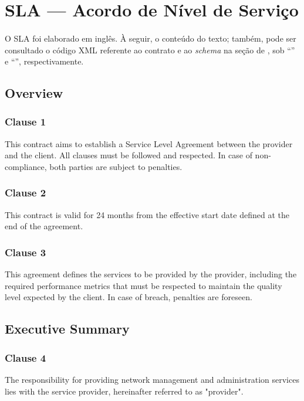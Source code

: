 \section{SLA --- Acordo de Nível de Serviço}
\paragraph{}
O SLA foi elaborado em inglês. À seguir, o conteúdo do texto; também, pode ser consultado o código XML referente ao
contrato e ao \textit{schema} na seção de , sob ``'' e ``'',
respectivamente.

\subsection{Overview}
\subsubsection*{Clause 1}
This contract aims to establish a Service Level Agreement between the provider and the client. All clauses must be followed and respected. In case of non-compliance, both parties are subject to penalties.

\subsubsection*{Clause 2}
This contract is valid for 24 months from the effective start date defined at the end of the agreement.

\subsubsection*{Clause 3}
This agreement defines the services to be provided by the provider, including the required performance metrics that must be respected to maintain the quality level expected by the client. In case of breach, penalties are foreseen.

\subsection{Executive Summary}
\subsubsection*{Clause 4}
The responsibility for providing network management and administration services lies with the service provider, hereinafter referred to as "provider".

